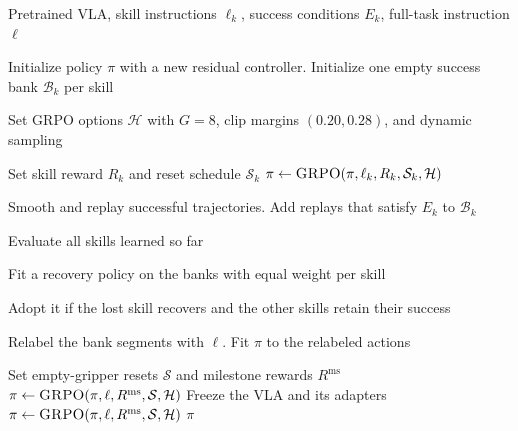 \makeatletter
\providecommand{\parState}[1]{\State\parbox[t]{\dimexpr\linewidth-\ALG@thistlm\relax}{\raggedright\strut#1\strut}}
\makeatother

\begin{algorithm}[!t]
\caption{Staged VLA adaptation}
\label{alg:paper_pipeline}
\small
\algrenewcommand\algorithmicindent{1.0em}
\begin{algorithmic}[1]
\Require Pretrained VLA, skill instructions $\ell_k$, success conditions $E_k$, full-task instruction $\ell$
\parState{Initialize policy $\pi$ with a new residual controller. Initialize one empty success bank $\mathcal B_k$ per skill}
\parState{Set GRPO options $\mathcal H$ with $G=8$, clip margins $(0.20,0.28)$, and dynamic sampling}
    \State Set skill reward $R_k$ and reset schedule $\mathcal S_k$
    \State $\pi\gets\Call{GRPO}{\pi,\ell_k,R_k,\mathcal S_k,\mathcal H}$
    \parState{Smooth and replay successful trajectories. Add replays that satisfy $E_k$ to $\mathcal B_k$}
    \State Evaluate all skills learned so far
      \parState{Fit a recovery policy on the banks with equal weight per skill}
      \parState{Adopt it if the lost skill recovers and the other skills retain their success}
    \EndIf
  \EndFor
\EndFor
\parState{Relabel the bank segments with $\ell$. Fit $\pi$ to the relabeled actions}
\State Set empty-gripper resets $\mathcal S$ and milestone rewards $R^{\mathrm{ms}}$
\State $\pi\gets\Call{GRPO}{\pi,\ell,R^{\mathrm{ms}},\mathcal S,\mathcal H}$
  \State Freeze the VLA and its adapters
  \State $\pi\gets\Call{GRPO}{\pi,\ell,R^{\mathrm{ms}},\mathcal S,\mathcal H}$
\EndIf
\State \Return $\pi$
\end{algorithmic}
\end{algorithm}
